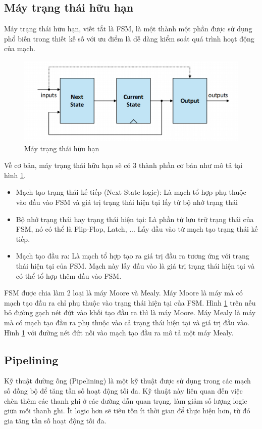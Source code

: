 \subsection{Máy trạng thái hữu hạn}
Máy trạng thái hữu hạn, viết tắt là FSM, là một thành một phần được sử dụng phổ biến trong thiết kế số với ưu điểm là dễ dàng kiểm soát quá trình hoạt động của mạch. 
\begin{figure}[!ht]
    \centering
    \includegraphics[width=1\linewidth]{figures/fsm.png}
    \caption{Máy trạng thái hữu hạn}
    \label{fig:fsm}
\end{figure}
Về cơ bản, máy trạng thái hữu hạn sẽ có 3 thành phần cơ bản như mô tả tại hình \ref{fig:fsm}. 
\begin{itemize}
    \item Mạch tạo trạng thái kế tiếp (Next State logic): Là mạch tổ hợp phụ thuộc vào đầu vào FSM và giá trị trạng thái hiện tại lấy từ bộ nhớ trạng thái
    \item Bộ nhớ trạng thái hay trạng thái hiện tại: Là phần tử lưu trữ trạng thái của FSM, nó có thể là Flip-Flop, Latch, ... Lấy đầu vào từ mạch tạo trạng thái kế tiếp. 
    \item Mạch tạo đầu ra: Là mạch tổ hợp tạo ra giá trị đầu ra tương ứng với trạng thái hiện tại của FSM. Mạch này lấy đầu vào là giá trị trạng thái hiện tại và có thể tổ hợp thêm đầu vào FSM. 
\end{itemize}


FSM được chia làm 2 loại là máy Moore và Mealy. Máy Moore là máy mà có mạch tạo đầu ra chỉ phụ thuộc vào trạng thái hiện tại của FSM. Hình \ref{fig:fsm} trên nếu bỏ đường gạch nét đứt vào khối tạo đầu ra thì là máy Moore. Máy Mealy là máy mà có mạch tạo đầu ra phụ thuộc vào cả trạng thái hiện tại và giá trị đầu vào. Hình \ref{fig:fsm} với đường nét đứt nối vào mạch tạo đầu ra mô tả một máy Mealy.
\subsection{Pipelining}
Kỹ thuật đường ống (Pipelining) là một kỹ thuật được sử dụng trong các mạch số đồng bộ để tăng tần số hoạt động tối đa. Kỹ thuật này liên quan đến việc chèn thêm các thanh ghi ở các đường dẫn quan trọng, làm giảm số lượng logic giữa mỗi thanh ghi. Ít logic hơn sẽ tiêu tốn ít thời gian để thực hiện hơn, từ đó gia tăng tần số hoạt động tối đa.

